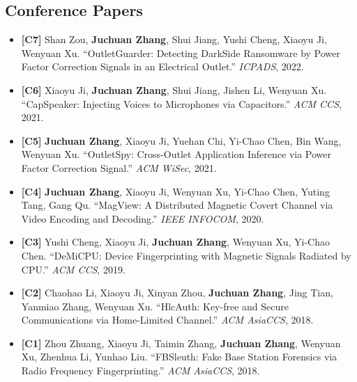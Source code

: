 \documentclass[11pt,a4paper]{article}
\begin{document}
\subsection*{Conference Papers}
\begin{itemize}
  \item \textbf{[C7]} Shan Zou, \textbf{Juchuan Zhang}, Shui Jiang, Yushi Cheng, Xiaoyu Ji, Wenyuan Xu.
  ``OutletGuarder: Detecting DarkSide Ransomware by Power Factor Correction Signals in an Electrical Outlet.''
  \emph{ICPADS}, 2022.

  \item \textbf{[C6]} Xiaoyu Ji, \textbf{Juchuan Zhang}, Shui Jiang, Jishen Li, Wenyuan Xu.
  ``CapSpeaker: Injecting Voices to Microphones via Capacitors.''
  \emph{ACM CCS}, 2021.

  \item \textbf{[C5]} \textbf{Juchuan Zhang}, Xiaoyu Ji, Yuehan Chi, Yi-Chao Chen, Bin Wang, Wenyuan Xu.
  ``OutletSpy: Cross-Outlet Application Inference via Power Factor Correction Signal.''
  \emph{ACM WiSec}, 2021.

  \item \textbf{[C4]} \textbf{Juchuan Zhang}, Xiaoyu Ji, Wenyuan Xu, Yi-Chao Chen, Yuting Tang, Gang Qu.
  ``MagView: A Distributed Magnetic Covert Channel via Video Encoding and Decoding.''
  \emph{IEEE INFOCOM}, 2020.

  \item \textbf{[C3]} Yushi Cheng, Xiaoyu Ji, \textbf{Juchuan Zhang}, Wenyuan Xu, Yi-Chao Chen.
  ``DeMiCPU: Device Fingerprinting with Magnetic Signals Radiated by CPU.''
  \emph{ACM CCS}, 2019.

  \item \textbf{[C2]} Chaohao Li, Xiaoyu Ji, Xinyan Zhou, \textbf{Juchuan Zhang}, Jing Tian, Yanmiao Zhang, Wenyuan Xu.
  ``HlcAuth: Key-free and Secure Communications via Home-Limited Channel.''
  \emph{ACM AsiaCCS}, 2018.

  \item \textbf{[C1]} Zhou Zhuang, Xiaoyu Ji, Taimin Zhang, \textbf{Juchuan Zhang}, Wenyuan Xu, Zhenhua Li, Yunhao Liu.
  ``FBSleuth: Fake Base Station Forensics via Radio Frequency Fingerprinting.''
  \emph{ACM AsiaCCS}, 2018.
\end{itemize}
\end{document}
